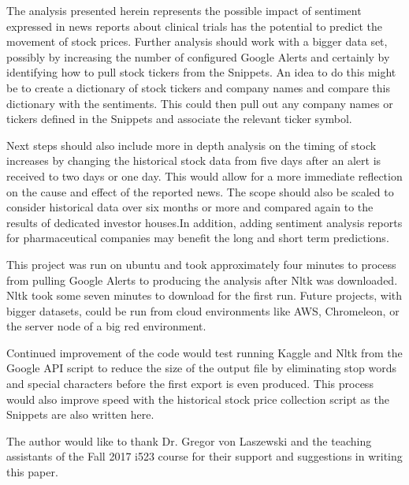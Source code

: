 \documentclass[sigconf]{acmart}
\begin{document}
The analysis presented herein represents the possible impact of sentiment expressed in news reports about clinical trials has the potential to predict the movement of stock prices. Further analysis should work with a bigger data set, possibly by increasing the number of configured Google Alerts and certainly by identifying how to pull stock tickers from the Snippets. An idea to do this might be to create a dictionary of stock tickers and company names and compare this dictionary with the sentiments. This could then pull out any company names or tickers defined in the Snippets and associate the relevant ticker symbol. 

Next steps should also include more in depth analysis on the timing of stock increases by changing the historical stock data from five days after an alert is received to two days or one day. This would allow for a more immediate reflection on the cause and effect of the reported news. The scope should also be scaled to consider historical data over six months or more and compared again to the results of dedicated investor houses.In addition, adding sentiment analysis reports for pharmaceutical companies may benefit the long and short term predictions.

This project was run on ubuntu and took approximately four minutes to process from pulling Google Alerts to producing the analysis after Nltk was downloaded. Nltk took some seven minutes to download for the first run. Future projects, with bigger datasets, could be run from cloud environments like AWS, Chromeleon, or the server node of a big red environment. 

Continued improvement of the code would test running Kaggle and Nltk from the Google API script to reduce the size of the output file by eliminating stop words and special characters before the first export is even produced. This process would also improve speed with the historical stock price collection script as the Snippets are also written here.


\begin{acks}

The author would like to thank Dr. Gregor von Laszewski and the teaching assistants of the Fall 2017 i523 course for their support and suggestions in writing this paper. 

\end{acks}


 
\end{document}
